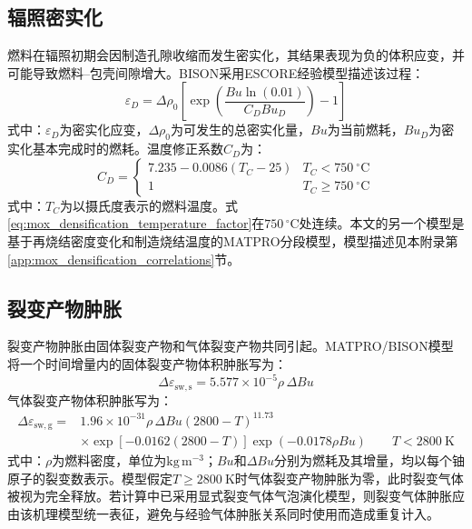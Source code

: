\subsection{辐照密实化}

燃料在辐照初期会因制造孔隙收缩而发生密实化，其结果表现为负的体积应变，并可能导致燃料--包壳间隙增大。BISON采用ESCORE经验模型描述该过程：
\begin{equation}
	\varepsilon_D
	=\Delta\rho_0
	\left[
	\exp\!\left(
	\frac{Bu\ln(0.01)}{C_DBu_D}
	\right)-1
	\right]
	\label{eq:mox_escore_densification}
\end{equation}
\noindent 式中：$\varepsilon_D$为密实化应变，$\Delta\rho_0$为可发生的总密实化量，$Bu$为当前燃耗，$Bu_D$为密实化基本完成时的燃耗。温度修正系数$C_D$为：
\begin{equation}
	C_D=
	\begin{cases}
		7.235-0.0086(T_C-25) & T_C<750\ ^\circ\mathrm{C}\\
		1                    & T_C\geq750\ ^\circ\mathrm{C}
	\end{cases}
	\label{eq:mox_densification_temperature_factor}
\end{equation}
\noindent 式中：$T_C$为以摄氏度表示的燃料温度。式\eqref{eq:mox_densification_temperature_factor}在$750\,{}^\circ\mathrm{C}$处连续。本文的另一个模型是基于再烧结密度变化和制造烧结温度的MATPRO分段模型，模型描述见本附录第\ref{app:mox_densification_correlations}节。

\subsection{裂变产物肿胀}

裂变产物肿胀由固体裂变产物和气体裂变产物共同引起。MATPRO/BISON模型将一个时间增量内的固体裂变产物体积肿胀写为：
\begin{equation}
	\Delta\varepsilon_{\mathrm{sw,s}}
	=5.577\times10^{-5}\rho\,\Delta Bu
	\label{eq:mox_solid_fission_product_swelling}
\end{equation}
气体裂变产物体积肿胀写为：
\begin{equation}
	\begin{aligned}
		\Delta\varepsilon_{\mathrm{sw,g}}
		={}&1.96\times10^{-31}\rho\,\Delta Bu
		(2800-T)^{11.73}\\
		&\times\exp\!\left[-0.0162(2800-T)\right]
		\exp(-0.0178\rho Bu)
		\qquad T<2800\ \mathrm{K}
	\end{aligned}
	\label{eq:mox_gaseous_fission_product_swelling}
\end{equation}
\noindent 式中：$\rho$为燃料密度，单位为$\mathrm{kg\,m^{-3}}$；$Bu$和$\Delta Bu$分别为燃耗及其增量，均以每个铀原子的裂变数表示。模型假定$T\geq2800\ \mathrm{K}$时气体裂变产物肿胀为零，此时裂变气体被视为完全释放。若计算中已采用显式裂变气体气泡演化模型，则裂变气体肿胀应由该机理模型统一表征，避免与经验气体肿胀关系同时使用而造成重复计入。

